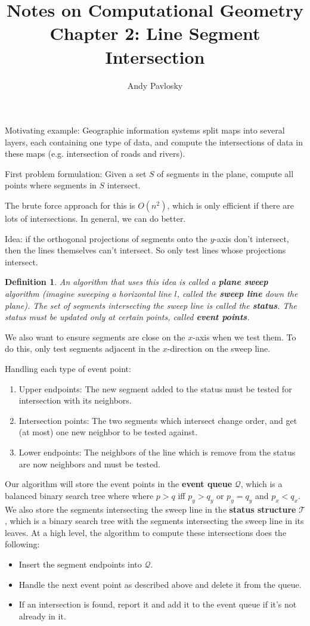 \documentclass[11pt]{article}
\title{Notes on Computational Geometry\\Chapter 2: Line Segment Intersection}
\author{Andy Pavlosky}
\date{}
\newtheorem{definition}{Definition}
\begin{document}
\maketitle

Motivating example: Geographic information systems split maps into several layers, each containing one type of data, and compute the intersections of data in these maps (e.g. intersection of roads and rivers).

First problem formulation: Given a set $S$ of segments in the plane, compute all points where segments in $S$ intersect.

The brute force approach for this is $O(n^2)$, which is only efficient if there are lots of intersections. In general, we can do better.

Idea: if the orthogonal projections of segments onto the $y$-axis don't intersect, then the lines themselves can't intersect. So only test lines whose projections intersect.

\begin{definition}
An algorithm that uses this idea is called a \textbf{plane sweep} algorithm (imagine sweeping a horizontal line $l$, called the \textbf{sweep line} down the plane). The set of segments intersecting the sweep line is called the \textbf{status}. The status must be updated only at certain points, called \textbf{event points}.
\end{definition}

We also want to ensure segments are close on the $x$-axis when we test them. To do this, only test segments adjacent in the $x$-direction on the sweep line.

Handling each type of event point:
\begin{enumerate}
    \item Upper endpoints: The new segment added to the status must be tested for intersection with its neighbors.
    \item Intersection points: The two segments which intersect change order, and get (at most) one new neighbor to be tested against.
    \item Lower endpoints: The neighbors of the line which is remove from the status are now neighbors and must be tested.
\end{enumerate}

Our algorithm will store the event points in the \textbf{event queue} $\mathcal{Q}$, which is a balanced binary search tree where where $p > q$ iff $p_y > q_y$ or $p_y=q_y$ and $p_x < q_x$. We also store the segments intersecting the sweep line in the \textbf{status structure} $\mathcal{T}$, which is a binary search tree with the segments intersecting the sweep line in its leaves. At a high level, the algorithm to compute these intersections does the following:
\begin{itemize}
    \item Insert the segment endpoints into $\mathcal{Q}$.
    \item Handle the next event point as described above and delete it from the queue.
    \item If an intersection is found, report it and add it to the event queue if it's not already in it.
\end{itemize}
\end{document}

